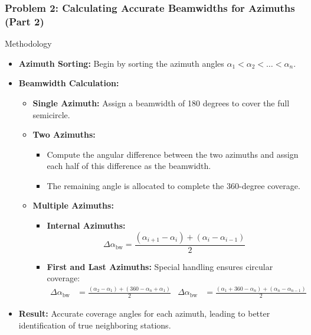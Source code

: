 \begin{frame}
    \frametitle{Problem 2: Calculating Accurate Beamwidths for Azimuths (Part 2)}

    \begin{block}{Methodology}
        \begin{itemize}
            \item \textbf{Azimuth Sorting:} Begin by sorting the azimuth angles \( \alpha_1 < \alpha_2 < \dots < \alpha_n \).
            \item \textbf{Beamwidth Calculation:}
                \begin{itemize}
                    \item \textbf{Single Azimuth:} Assign a beamwidth of 180 degrees to cover the full semicircle.
                    \item \textbf{Two Azimuths:}
                        \begin{itemize}
                            \item Compute the angular difference between the two azimuths and assign each half of this difference as the beamwidth.
                            \item The remaining angle is allocated to complete the 360-degree coverage.
                        \end{itemize}
                    \item \textbf{Multiple Azimuths:}
                        \begin{itemize}
                            \item \textbf{Internal Azimuths:} 
                            \[
                            \Delta \alpha_{\text{bw}} = \frac{(\alpha_{i+1} - \alpha_i) + (\alpha_i - \alpha_{i-1})}{2}
                            \]
                            \item \textbf{First and Last Azimuths:} Special handling ensures circular coverage:
                            \begin{align*}
                            \Delta \alpha_{\text{bw}} & = \frac{(\alpha_2 - \alpha_1) + (360 - \alpha_n + \alpha_1)}{2} & \Delta \alpha_{\text{bw}} & = \frac{(\alpha_1 + 360 - \alpha_n) + (\alpha_n - \alpha_{n-1})}{2}
                            \end{align*}
                        \end{itemize}
                \end{itemize}
            \item \textbf{Result:} Accurate coverage angles for each azimuth, leading to better identification of true neighboring stations.
        \end{itemize}
    \end{block}
\end{frame}

